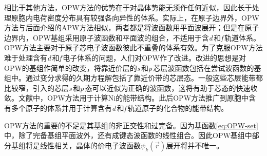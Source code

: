相比于其他方法，OPW方法的优势在于对晶体势能无须作任何近似，因此长于处理原胞内电荷密度分布具有较强各向异性的体系。实际上，在原子边界外，OPW方法与后面介绍的APW方法相似，两者都是将波函数用平面波展开；但是在原子边界内，OPW基组采用原子波函数和平面波的组合，不适用于含{\it d}\,和{\it f}\,轨道体系。OPW方法主要对于原子芯电子波函数彼此不重叠的体系有效。为了克服OPW方法难于处理含有{\it d}\,和{\it f}\,电子体系的问题，人们对OPW作了改进\cite{PR57-1169_1940,PR99-500_1955}。改进的思想是对OPW的基组作简单的改变，将靠近价层的{\it s}\,和{\it p}\,芯层波函数包括在尝试波函数的基组中。通过变分求得的久期方程解包括了靠近价带的芯层态。一般这些芯层能带都比较窄，引入的芯层{\it s}\,和{\it p}\,态可以近似为正确的波函数，这将有助于芯态的快速收敛。文献中，OPW方法用于计算Ni的能带结构。此后OPW方法推广到原胞中含有多个原子的体系并用于计算含有{\it d}\,和{\it f}\,轨道原子的化合物的能带结构\cite{PSSB94-51_1979,PSSB97-631_1980}。

OPW方法的重要的不足是其基组的非正交性和过完备。因为基函数\eqref{eq:OPW-set}中，除了完备基组平面波外，还有成键态波函数的线性组合。因此OPW基组中部分基组将是线性相关，晶体的价电子波函数$\psi_k(\vec r)$展开将并不唯一。%


